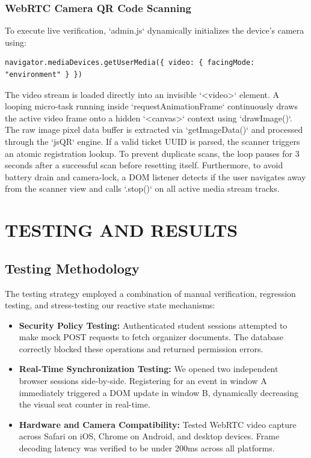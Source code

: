 \documentclass[14pt,a4paper]{extreport}
\begin{document}
\subsection{WebRTC Camera QR Code Scanning}
To execute live verification, `admin.js` dynamically initializes the device's camera using:
\begin{verbatim}
navigator.mediaDevices.getUserMedia({ video: { facingMode: "environment" } })
\end{verbatim}
The video stream is loaded directly into an invisible `<video>` element. A looping micro-task running inside `requestAnimationFrame` continuously draws the active video frame onto a hidden `<canvas>` context using `drawImage()`. The raw image pixel data buffer is extracted via `getImageData()` and processed through the `jsQR` engine. If a valid ticket UUID is parsed, the scanner triggers an atomic registration lookup. To prevent duplicate scans, the loop pauses for 3 seconds after a successful scan before resetting itself. Furthermore, to avoid battery drain and camera-lock, a DOM listener detects if the user navigates away from the scanner view and calls `.stop()` on all active media stream tracks.

\chapter{TESTING AND RESULTS}
\section{Testing Methodology}
The testing strategy employed a combination of manual verification, regression testing, and stress-testing our reactive state mechanisms:
\begin{itemize}
    \item \textbf{Security Policy Testing:} Authenticated student sessions attempted to make mock POST requests to fetch organizer documents. The database correctly blocked these operations and returned permission errors.
    \item \textbf{Real-Time Synchronization Testing:} We opened two independent browser sessions side-by-side. Registering for an event in window A immediately triggered a DOM update in window B, dynamically decreasing the visual seat counter in real-time.
    \item \textbf{Hardware and Camera Compatibility:} Tested WebRTC video capture across Safari on iOS, Chrome on Android, and desktop devices. Frame decoding latency was verified to be under 200ms across all platforms.
\end{itemize}
\end{document}
